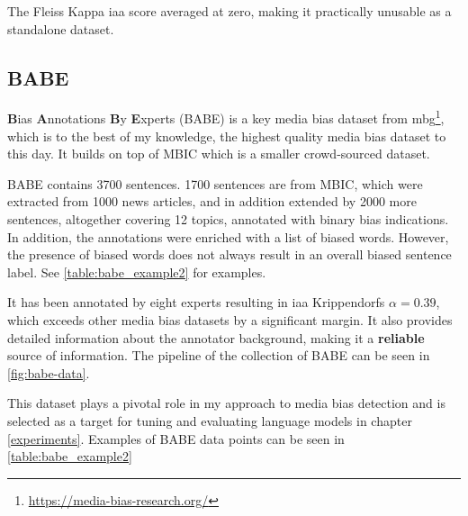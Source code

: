 The Fleiss Kappa \Gls{iaa} score averaged at zero, making it practically unusable as a standalone dataset.



\subsection{BABE}
\textbf{B}ias \textbf{A}nnotations \textbf{B}y \textbf{E}xperts (BABE)\cite{spinde2021neural} is a key media bias dataset from \Gls{mbg}\footnote{\url{https://media-bias-research.org/}}, which is to the best of my knowledge, the highest quality media bias dataset to this day. It builds on top of MBIC \cite{Spinde2021MBIC} which is a smaller crowd-sourced dataset.

BABE contains 3700 sentences. 1700 sentences are from MBIC, which were extracted from 1000 news articles, and in addition extended by 2000 more sentences, altogether covering 12 topics, annotated with binary bias indications. In addition, the annotations were enriched with a list of biased words. However, the presence of biased words does not always result in an overall biased sentence label. See \ref{table:babe_example2} for examples.

It has been annotated by eight experts resulting in \gls{iaa} Krippendorfs $\alpha = 0.39$, which exceeds other media bias datasets by a significant margin. It also provides detailed information about the annotator background, making it a \textbf{reliable} source of information. The pipeline of the collection of BABE can be seen in \ref{fig:babe-data}.

This dataset plays a pivotal role in my approach to media bias detection and is selected as a target for tuning and evaluating language models in chapter \ref{experiments}. Examples of BABE data points can be seen in 
\ref{table:babe_example2}




